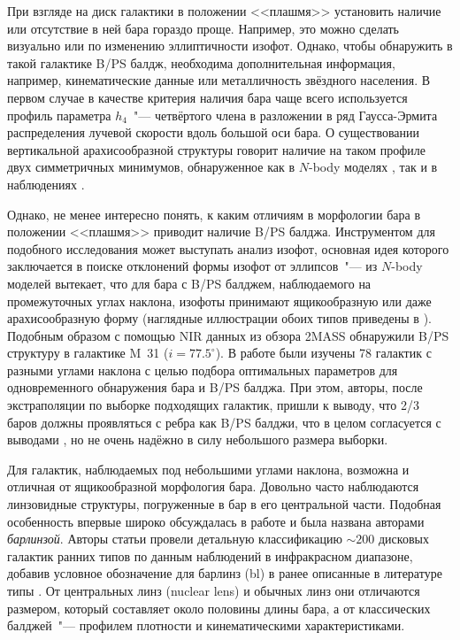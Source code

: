 \documentclass{trlnotes}
\begin{document}
При взгляде на диск галактики в положении <<плашмя>> установить наличие или отсутствие в ней бара гораздо проще. Например, это можно сделать визуально или по изменению эллиптичности изофот. Однако, чтобы обнаружить в такой галактике B/PS балдж, необходима дополнительная информация, например, кинематические данные или металличность звёздного населения. В первом случае в качестве критерия наличия бара чаще всего используется профиль параметра $h_4$~"---  четвёртого члена в разложении в ряд Гаусса-Эрмита \citep{vandermarel1993} распределения лучевой скорости вдоль большой оси бара.  О существовании вертикальной арахисообразной структуры говорит наличие на таком профиле двух симметричных минимумов, обнаруженное как в $N$-body моделях \citep{debattista2005,iannuzzi2015}, так и в наблюдениях \citep{mendez-abreu2008}.

Однако, не менее интересно понять, к каким отличиям в морфологии бара в положении  <<плашмя>> приводит наличие B/PS балджа.  Инструментом для подобного исследования может выступать анализ изофот, основная идея которого заключается в поиске отклонений формы изофот от эллипсов~"--- из $N$-body моделей вытекает, что для бара с B/PS балджем, наблюдаемого на промежуточных углах наклона, изофоты принимают ящикообразную или даже арахисообразную форму (наглядные иллюстрации обоих типов приведены в \cite[Fig.~2]{erwin2016}). Подобным образом с помощью NIR данных из обзора 2MASS  \citet{beaton2007} обнаружили B/PS структуру в галактике M~31 ($i = 77.5^\circ$). В работе \citet{erwin2013} были изучены 78 галактик с разными углами наклона с целью подбора оптимальных параметров для одновременного обнаружения бара и B/PS балджа. При этом, авторы, после экстраполяции по выборке подходящих галактик, пришли к выводу, что 2/3 баров должны проявляться с ребра как B/PS балджи, что в целом согласуется с выводами \citet{lutticke2000a}, но не очень надёжно в силу небольшого размера выборки.

Для галактик, наблюдаемых под небольшими углами наклона, возможна и отличная от ящикообразной морфология бара.  Довольно часто наблюдаются линзовидные структуры, погруженные в бар в его центральной части. Подобная особенность впервые широко обсуждалась в работе \citet{laurikainen2011} и была названа авторами \emph{барлинзой}.  Авторы статьи провели детальную классификацию $\sim\!200$ дисковых галактик ранних типов по данным наблюдений в инфракрасном диапазоне, добавив условное обозначение для барлинз (bl) в ранее описанные в литературе типы \citep{devaucouleurs1959,buta2010}. От центральных линз (nuclear lens) и обычных линз они отличаются размером, который составляет около половины длины бара, а от классических балджей~"--- профилем плотности и кинематическими характеристиками. 
\end{document}
